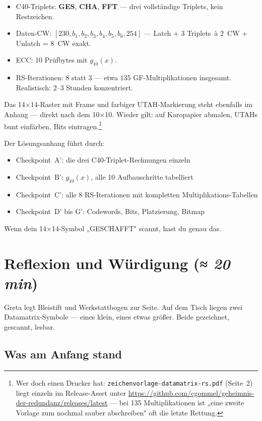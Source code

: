\begin{itemize}
\item C40-Triplets: \textbf{GES}, \textbf{CHA}, \textbf{FFT} — drei
  vollständige Triplets, kein Restzeichen.
\item Daten-CW: $[230, b_1, b_2, b_3, b_4, b_5, b_6, 254]$ —
  Latch + 3 Triplets~à 2~CW + Unlatch = 8~CW exakt.
\item ECC: 10 Prüfbytes mit $g_{10}(x)$.
\item RS-Iterationen: 8 statt 3 — etwa $135$ GF-Multiplikationen
  insgesamt. Realistisch: 2--3 Stunden konzentriert.
\end{itemize}

Das 14×14-Raster mit Frame und farbiger UTAH-Markierung steht
ebenfalls im Anhang — direkt nach dem 10×10. Wieder gilt: auf
Karopapier abmalen, UTAHs bunt einfärben, Bits eintragen.\footnote{%
Wer doch einen Drucker hat: \texttt{zeichenvorlage-datamatrix-rs.pdf}
(Seite~2) liegt einzeln im Release-Asset unter
\url{https://github.com/cgommel/geheimnis-der-redundanz/releases/latest}
— bei 135 Multiplikationen ist „eine zweite Vorlage zum nochmal
sauber abschreiben" oft die letzte Rettung.}

Der Lösungsanhang führt durch:

\begin{itemize}
\item Checkpoint~A': die drei C40-Triplet-Rechnungen einzeln
\item Checkpoint~B': $g_{10}(x)$, alle 10 Aufbauschritte tabelliert
\item Checkpoint~C': alle 8 RS-Iterationen mit kompletten Multiplikations-Tabellen
\item Checkpoint~D' bis G': Codewords, Bits, Platzierung, Bitmap
\end{itemize}

Wenn dein 14×14-Symbol „GESCHAFFT" scannt, hast du genau das.

\section{Reflexion und Würdigung \normalfont(\textit{≈ 20 min})}

Greta legt Bleistift und Werkstattbogen zur Seite. Auf dem Tisch
liegen zwei Datamatrix-Symbole — eines klein, eines etwas größer.
Beide gezeichnet, gescannt, lesbar.

\subsection*{Was am Anfang stand}

